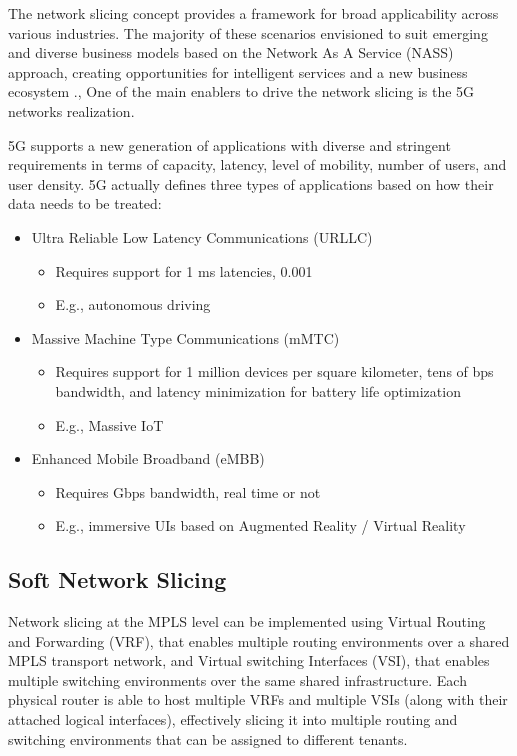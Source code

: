 \documentclass[journal,article,submit,moreauthors,pdftex]{Definitions/mdpi}
\begin{document}
The network slicing concept provides a framework for broad applicability across various industries. The majority of these scenarios envisioned to suit emerging and diverse business models based on the Network As A Service (NASS) approach, creating opportunities for intelligent services and a new business ecosystem \cite{kuklinski2019business,zhang2017network}., One of the main enablers to drive the network slicing is the 5G networks realization.

5G supports a new generation of applications with diverse and stringent requirements in terms of capacity, latency, level of mobility, number of users, and user density. 5G actually defines three types of applications based on how their data needs to be treated:

\begin{itemize}
\item Ultra Reliable Low Latency Communications (URLLC)
\begin{itemize}
\item Requires support for 1 ms latencies, 0.001%
\item E.g., autonomous driving
\end{itemize}
\item Massive Machine Type Communications (mMTC)
\begin{itemize}
\item Requires support for 1 million devices per square kilometer, tens of bps bandwidth, and latency minimization for battery life optimization
\item E.g., Massive IoT
\end{itemize}
\item Enhanced Mobile Broadband (eMBB)
\begin{itemize}
\item Requires Gbps bandwidth, real time or not
\item  E.g., immersive UIs based on Augmented Reality / Virtual Reality
\end{itemize}
\end{itemize}

\subsection{Soft Network Slicing}

Network slicing at the MPLS level can be implemented using Virtual Routing and Forwarding (VRF), that enables multiple routing environments over a shared MPLS transport network, and Virtual switching Interfaces (VSI), that enables multiple switching environments over the same shared infrastructure. Each physical router is able to host multiple VRFs and multiple VSIs (along with their attached logical interfaces), effectively slicing it into multiple routing and switching environments that can be assigned to different tenants.
\end{document}
